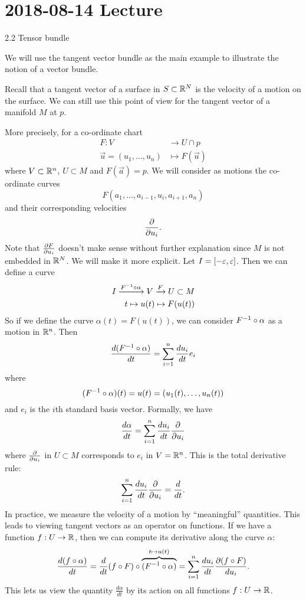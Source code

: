 \section{2018-08-14 Lecture}

2.2 Tensor bundle

We will use the tangent vector bundle as the main example to illustrate the notion of a vector bundle.

Recall that a tangent vector of a surface in $S \subset \mathbb{R}^N$ is the velocity of a motion on the surface.
We can still use this point of view for the tangent vector of a manifold $M$ at $p$.

More precisely, for a co-ordinate chart
\begin{align*}
  F: V &\to U \cap p \\
  \vec u = (u_1,\ldots,u_n) &\mapsto F(\vec u)
\end{align*}
where $V \subset \mathbb{R}^n$, $U \subset M$ and $F(\vec a)=p$.
We will consider as motions the co-ordinate curves
\[ F(a_1,\ldots,a_{i-1},u_i,a_{i+1},a_n) \]
and their corresponding velocities
\[ \frac{\partial}{\partial u_i}. \]
Note that $\tfrac{\partial F}{\partial u_i}$ doesn't make sense without further explanation since $M$ is not embedded in $\mathbb{R}^N$.
We will make it more explicit.
Let $I=[-\varepsilon,\varepsilon]$.
Then we can define a curve
\begin{align*}
  I \xrightarrow{F^{-1}\circ\alpha} V \xrightarrow{F} U \subset M \\
  t \mapsto u(t) \mapsto F(u(t))
\end{align*}
So if we define the curve $\alpha(t) = F(u(t))$, we can consider $F^{-1}\circ\alpha$ as a motion in $\mathbb{R}^n$.
Then
\[ \frac{d(F^{-1}\circ\alpha)}{dt} = \sum_{i=1}^n \frac{du_i}{dt}e_i \]
where
\[ (F^{-1}\circ\alpha)(t) = u(t) = \left( u_1(t),\ldots,u_n(t) \right) \]
and $e_i$ is the $i$th standard basis vector.
Formally, we have
\[ \frac{d\alpha}{dt} = \sum_{i=1}^n \frac{du_i}{dt} \frac{\partial}{\partial u_i} \]
where $\tfrac{\partial}{\partial u_i}$ in $U \subset M$ corresponds to $e_i$ in $V=\mathbb{R}^n$.
This is the total derivative rule:
\[ \sum_{i=1}^n \frac{du_i}{dt} \frac{\partial}{\partial u_i} = \frac{d}{dt}. \]
In practice, we measure the velocity of a motion by ``meaningful'' quantities.
This leads to viewing tangent vectors as an operator on functions.
If we have a function $f: U \to \mathbb{R}$, then we can compute its derivative along the curve $\alpha$:
\[ \frac{d(f\circ\alpha)}{dt} = \frac{d}{dt}(f\circ F)\circ\overbrace{(F^{-1}\circ\alpha)}^{t \mapsto u(t)} = \sum_{i=1}^n \frac{du_i}{dt}\frac{\partial(f\circ F)}{d u_i}. \]
This lets us view the quantity $\tfrac{d\alpha}{dt}$ by its action on all functions $f: U \to \mathbb{R}$.

